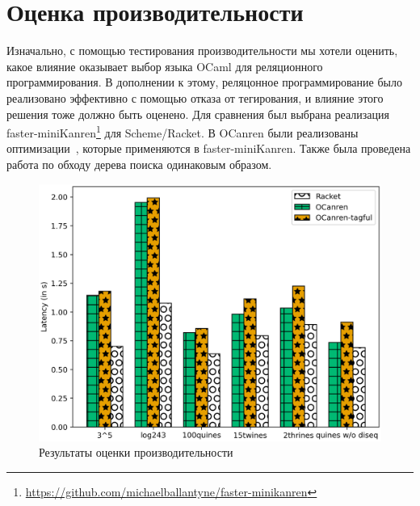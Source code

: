 

\section{Оценка производительности}
\label{sec:evaluation}

Изначально, с помощью тестирования производительности мы хотели оценить, какое влияние оказывает выбор языка OCaml для реляционного программирования.
В дополнении к этому, реляцонное программирование было реализовано эффективно с помощью отказа от тегирования, и влияние этого решения тоже должно быть оценено.
Для сравнения был выбрана реализация faster-miniKanren\footnote{\url{https://github.com/michaelballantyne/faster-minikanren}} для Scheme/Racket.
В OCanren были реализованы оптимизации~\cite{WillThesis, Optimizations}, которые применяются в faster-miniKanren.
Также была проведена работа по обходу дерева поиска одинаковым образом.
%

\begin{figure}[t]
\centering
\includegraphics[scale=0.8]{graph.png}
\caption{Результаты оценки производительности}
\label{eval}
\end{figure}

